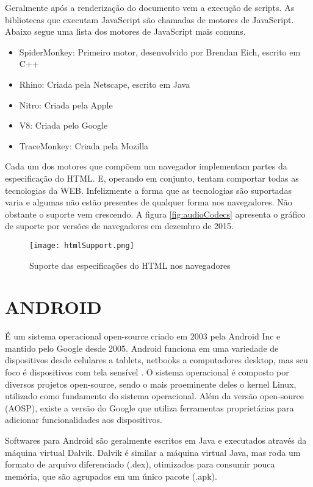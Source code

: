 Geralmente após a renderização do documento vem a execução de scripts.
As bibliotecas que executam JavaScript são chamadas de motores de JavaScript.
Abaixo segue uma lista dos motores de JavaScript mais comuns.

\begin{itemize}
    \item SpiderMonkey: Primeiro motor, desenvolvido por Brendan Eich, escrito em C++
    \item Rhino: Criada pela Netscape, escrito em Java
    \item Nitro: Criada pela Apple
    \item V8: Criada pelo Google
    \item TraceMonkey: Criada pela Mozilla
\end{itemize}

Cada um dos motores que compõem um navegador implementam partes da
especificação do HTML. E, operando em conjunto, tentam comportar
todas as tecnologias da WEB. Infelizmente a forma que as tecnologias
são suportadas varia e algumas não estão presentes de qualquer
forma nos navegadores. Não obstante o suporte vem crescendo. A figura
\ref{fig:audioCodecs} apresenta o gráfico de suporte por versões de
navegadores em dezembro de 2015.

\begin{figure}[H]
    \centering
    \texttt{[image: htmlSupport.png]}
	\caption{Suporte das especificações do HTML nos navegadores}
    \label{fig:htmlSupport}
\end{figure}

\section{ANDROID}

É um sistema operacional open-source criado em 2003 pela Android
Inc e mantido pelo Google desde 2005. Android funciona em uma
variedade de dispositivos desde celulares a tablets, netbooks a
computadores desktop, mas seu foco é dispositivos com tela sensível
\autocite{chromeVsAndroid}. O sistema operacional é composto por
diversos projetos open-source, sendo o mais proeminente deles o kernel
Linux, utilizado como fundamento do sistema operacional. Além
da versão open-source (AOSP), existe a versão do Google que utiliza
ferramentas proprietárias  para adicionar funcionalidades aos dispositivos.

Softwares para Android são geralmente escritos em Java e executados
através da máquina virtual Dalvik. Dalvik é similar a máquina
virtual Java, mas roda um formato de arquivo diferenciado (.dex),
otimizados para consumir pouca memória, que são agrupados em um único
pacote (.apk). 

